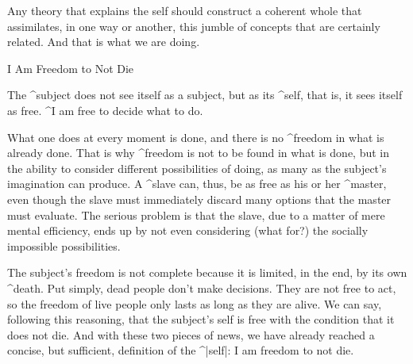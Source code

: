
Any theory that explains the self should construct a coherent whole that
assimilates, in one way or another, this jumble of concepts that are
certainly related. And that is what we are doing.


\Section I Am Freedom to Not Die

The ^{subject} does not see itself as a subject, but as its ^{self},
that is, it sees itself as free. ^{I} am free to decide what to do.

What one does at every moment is done, and there is no ^{freedom} in
what is already done. That is why ^{freedom} is not to be found in what
is done, but in the ability to consider different possibilities of
doing, as many as the subject's imagination can produce. A ^{slave} can,
thus, be as free as his or her ^{master}, even though the slave must
immediately discard many options that the master must evaluate. The
serious problem is that the slave, due to a matter of mere mental
efficiency, ends up by not even considering (what for?) the socially
impossible possibilities.

The subject's freedom is not complete because it is limited, in the end,
by its own ^{death}. Put simply, dead people don't make decisions. They
are not free to act, so the freedom of live people only lasts as long as
they are alive. We can say, following this reasoning, that the subject's
self is free with the condition that it does not die. And with these two
pieces of news, we have already reached a concise, but sufficient,
definition of the ^|self|: I am freedom to not die.

